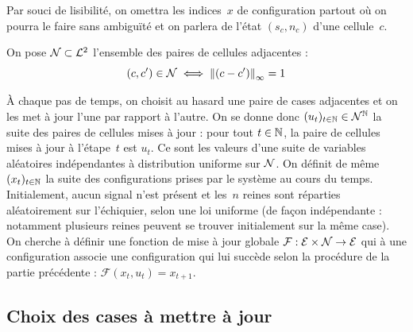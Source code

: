 Par souci de lisibilité, on omettra les indices~$x$ de configuration partout où on pourra le faire sans ambiguïté et on parlera de l'état $(s_c, n_c)$ d'une cellule~$c$.

On pose $\mathcal{N} \subset \mathcal{L}^2$ l'ensemble des paires de cellules adjacentes : $$(c, c') \in \mathcal{N} \iff \left\lVert(c-c')\right\rVert_\infty = 1$$

À chaque pas de temps, on choisit au hasard une paire de cases adjacentes et on les met à jour l'une par rapport à l'autre.
On se donne donc $(u_t)_{t\in\mathbb{N}} \in \mathcal{N}^{\mathbb{N}}$ la suite des paires de cellules mises à jour : pour tout $t\in\mathbb{N}$, la paire de cellules mises à jour à l'étape~$t$ est $u_t$. Ce sont les valeurs d'une suite de variables aléatoires indépendantes à distribution uniforme sur $\mathcal{N}$. On définit de même $(x_t)_{t\in\mathbb{N}}$ la suite des configurations prises par le système au cours du temps. Initialement, aucun signal n'est présent et les~$n$ reines sont réparties aléatoirement sur l'échiquier, selon une loi uniforme (de façon indépendante : notamment plusieurs reines peuvent se trouver initialement sur la même case). 
On cherche à définir une fonction de mise à jour globale $\mathcal{F} : {\mathcal{E}\times\mathcal{N}}\to\mathcal{E}$ qui à une configuration associe une configuration qui lui succède selon la procédure de la partie précédente : \mbox{$\mathcal{F}(x_t, u_t) = x_{t+1}$}.

 
\subsection{Choix des cases à mettre à jour}

